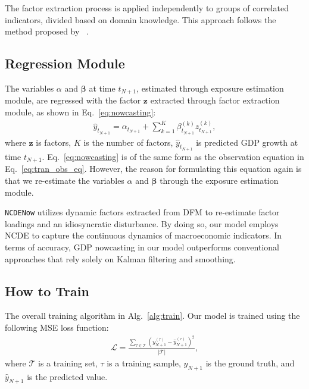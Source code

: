 \documentclass[sigconf]{acmart}
\begin{document}
The factor extraction process is applied independently to groups of correlated indicators, divided based on domain knowledge. This approach follows the method proposed by ~\citet{banbura2010nowcasting}.


\subsection{Regression Module}
The variables $\alpha$ and $\mathbf{\bm{\beta}}$ at time $t_{N+1}$, estimated through exposure estimation module, are regressed with the factor $\mathbf{z}$ extracted through factor extraction module, as shown in Eq.~\eqref{eq:nowcasting}:
\begin{align}\label{eq:nowcasting}
    \hat{y}_{t_{N+1}} = \alpha_{t_{N+1}} + \sum_{k=1}^{K} \beta_{t_{N+1}}^{(k)}z_{t_{N+1}}^{(k)},
\end{align} where $\mathbf{z}$ is factors, $K$ is the number of factors, $\hat{y}_{t_{N+1}}$ is predicted GDP growth at time $t_{N+1}$. 
Eq.~\eqref{eq:nowcasting} is of the same form as the observation equation in Eq.~\eqref{eq:tran_obs_eq}. However, the reason for formulating this equation again is that we re-estimate the variables $\alpha$ and $\mathbf{\bm{\beta}}$ through the exposure estimation module.

\texttt{NCDENow} utilizes dynamic factors extracted from DFM to re-estimate factor loadings and an idiosyncratic disturbance. By doing so, our model employs NCDE to capture the continuous dynamics of macroeconomic indicators. In terms of accuracy, GDP nowcasting in our model outperforms conventional approaches that rely solely on Kalman filtering and smoothing.


\subsection{How to Train}
The overall training algorithm in Alg.~\ref{alg:train}. 
Our model is trained using the following MSE loss function:
\begin{align}\label{eq:loss_mse}
    \mathcal{L} = \frac{\sum_{\tau\in\mathcal{T}} (y_{N+1}^{(\tau)}-\hat{y}_{N+1}^{(\tau)})^{2}}{|\mathcal{T}|},
\end{align}where $\mathcal{T}$ is a training set, $\tau$ is a training sample, $y_{N+1}$ is the ground truth, and $\hat{y}_{N+1}$ is the predicted value.
\end{document}
